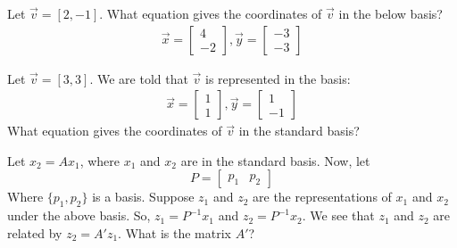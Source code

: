 

\begin{enumerate}

\qitem Let $\vec{v} = [2,-1]$. What equation gives the coordinates of $\vec{v}$ in the below basis?
\begin{gather*}
\vec{x} = 
\begin{bmatrix}
4 \\
-2
\end{bmatrix},
\vec{y} = \begin{bmatrix}
-3 \\
-3
\end{bmatrix}
\end{gather*}



\qitem Let $\vec{v} = [3,3]$. We are told that $\vec{v}$ is represented in the basis:
\begin{gather*}
\vec{x} = 
\begin{bmatrix}
1 \\
1
\end{bmatrix},
\vec{y} = \begin{bmatrix}
1 \\
-1
\end{bmatrix}
\end{gather*}
What equation gives the coordinates of $\vec{v}$ in the standard basis?








\qitem Let $x_2 = Ax_1$, where $x_1$ and $x_2$ are in the standard basis. Now, let 
$$
P = 
\begin{bmatrix}
p_1 & p_2
\end{bmatrix}
$$
Where $\{p_1, p_2\}$ is a basis. Suppose $z_1$ and $z_2$ are the representations of $x_1$ and $x_2$ under the above basis. So, $z_1 = P^{-1}x_1$ and $z_2 = P^{-1}x_2$. We see that $z_1$ and $z_2$ are related by $z_2 = A'z_1$. What is the matrix $A'$?





\end{enumerate}
